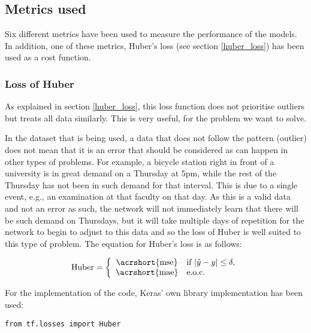 \subsection{Metrics used}

Six different metrics have been used to measure the performance of the models. In addition, one of these metrics, Huber's loss (see section \ref{huber_loss}) has been used as a cost function.

\subsubsection{Loss of Huber}


As explained in section \ref{huber_loss}, this loss function does not prioritise outliers but treats all data similarly. This is very useful, for the problem we want to solve.
\newline

In the dataset that is being used, a data that does not follow the pattern (outlier) does not mean that it is an error that should be considered as can happen in other types of problems. For example, a bicycle station right in front of a university is in great demand on a Thursday at 5pm, while the rest of the Thursday has not been in such demand for that interval. This is due to a single event, e.g., an examination at that faculty on that day. As this is a valid data and not an error as such, the network will not immediately learn that there will be such demand on Thursdays, but it will take multiple days of repetition for the network to begin to adjust to this data and so the loss of Huber is well suited to this type of problem. The equation for Huber's loss is as follows:

\begin{equation}
\centering
    \begin{split}
    \text{Huber} = \left\{ 
        \begin{array}{cl} 
            \text{\acrshort{mse}} & \text{if }|\hat{y}-y| \le \delta, \\
            \text{\acrshort{mae}} & \text{e.o.c.}
        \end{array}\right.
    \end{split}
\end{equation}

For the implementation of the code, Keras' own library implementation has been used:

\begin{verbatim}
from tf.losses import Huber
\end{verbatim}

